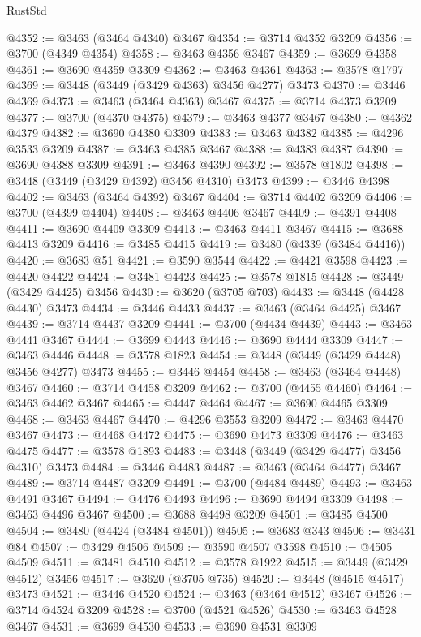 \begin{lexlean}{RustStd}
\begin{coremodule}
{{{{{{{{{{{{{{{{{{{@4352 := @3463 (@3464 @4340) @3467
@4354 := @3714 @4352 @3209
@4356 := @3700 (@4349 @4354)
@4358 := @3463 @4356 @3467
@4359 := @3699 @4358
@4361 := @3690 @4359 @3309
@4362 := @3463 @4361
@4363 := @3578 @1797
@4369 := @3448 (@3449 (@3429 @4363) @3456 @4277) @3473
@4370 := @3446 @4369
@4373 := @3463 (@3464 @4363) @3467
@4375 := @3714 @4373 @3209
@4377 := @3700 (@4370 @4375)
@4379 := @3463 @4377 @3467
@4380 := @4362 @4379
@4382 := @3690 @4380 @3309
@4383 := @3463 @4382
@4385 := @4296 @3533 @3209
@4387 := @3463 @4385 @3467
@4388 := @4383 @4387
@4390 := @3690 @4388 @3309
@4391 := @3463 @4390
@4392 := @3578 @1802
@4398 := @3448 (@3449 (@3429 @4392) @3456 @4310) @3473
@4399 := @3446 @4398
@4402 := @3463 (@3464 @4392) @3467
@4404 := @3714 @4402 @3209
@4406 := @3700 (@4399 @4404)
@4408 := @3463 @4406 @3467
@4409 := @4391 @4408
@4411 := @3690 @4409 @3309
@4413 := @3463 @4411 @3467
@4415 := @3688 @4413 @3209
@4416 := @3485 @4415
@4419 := @3480 (@4339 (@3484 @4416))
@4420 := @3683 @51
@4421 := @3590 @3544
@4422 := @4421 @3598
@4423 := @4420 @4422
@4424 := @3481 @4423
@4425 := @3578 @1815
@4428 := @3449 (@3429 @4425) @3456
@4430 := @3620 (@3705 @703)
@4433 := @3448 (@4428 @4430) @3473
@4434 := @3446 @4433
@4437 := @3463 (@3464 @4425) @3467
@4439 := @3714 @4437 @3209
@4441 := @3700 (@4434 @4439)
@4443 := @3463 @4441 @3467
@4444 := @3699 @4443
@4446 := @3690 @4444 @3309
@4447 := @3463 @4446
@4448 := @3578 @1823
@4454 := @3448 (@3449 (@3429 @4448) @3456 @4277) @3473
@4455 := @3446 @4454
@4458 := @3463 (@3464 @4448) @3467
@4460 := @3714 @4458 @3209
@4462 := @3700 (@4455 @4460)
@4464 := @3463 @4462 @3467
@4465 := @4447 @4464
@4467 := @3690 @4465 @3309
@4468 := @3463 @4467
@4470 := @4296 @3553 @3209
@4472 := @3463 @4470 @3467
@4473 := @4468 @4472
@4475 := @3690 @4473 @3309
@4476 := @3463 @4475
@4477 := @3578 @1893
@4483 := @3448 (@3449 (@3429 @4477) @3456 @4310) @3473
@4484 := @3446 @4483
@4487 := @3463 (@3464 @4477) @3467
@4489 := @3714 @4487 @3209
@4491 := @3700 (@4484 @4489)
@4493 := @3463 @4491 @3467
@4494 := @4476 @4493
@4496 := @3690 @4494 @3309
@4498 := @3463 @4496 @3467
@4500 := @3688 @4498 @3209
@4501 := @3485 @4500
@4504 := @3480 (@4424 (@3484 @4501))
@4505 := @3683 @343
@4506 := @3431 @84
@4507 := @3429 @4506
@4509 := @3590 @4507 @3598
@4510 := @4505 @4509
@4511 := @3481 @4510
@4512 := @3578 @1922
@4515 := @3449 (@3429 @4512) @3456
@4517 := @3620 (@3705 @735)
@4520 := @3448 (@4515 @4517) @3473
@4521 := @3446 @4520
@4524 := @3463 (@3464 @4512) @3467
@4526 := @3714 @4524 @3209
@4528 := @3700 (@4521 @4526)
@4530 := @3463 @4528 @3467
@4531 := @3699 @4530
@4533 := @3690 @4531 @3309
}}}}}}}}}}}}}}}}}}}
\end{coremodule}
\end{lexlean}
